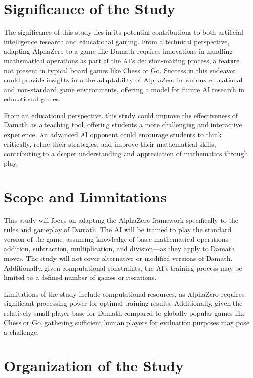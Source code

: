 \section{Significance of the Study}

The significance of this study lies in its potential contributions to both artificial intelligence research and educational gaming. From a technical perspective, adapting AlphaZero to a game like Damath requires innovations in handling mathematical operations as part of the AI’s decision-making process, a feature not present in typical board games like Chess or Go. Success in this endeavor could provide insights into the adaptability of AlphaZero in various educational and non-standard game environments, offering a model for future AI research in educational games.

From an educational perspective, this study could improve the effectiveness of Damath as a teaching tool, offering students a more challenging and interactive experience. An advanced AI opponent could encourage students to think critically, refine their strategies, and improve their mathematical skills, contributing to a deeper understanding and appreciation of mathematics through play.

\section{Scope and Limnitations}

This study will focus on adapting the AlphaZero framework specifically to the rules and gameplay of Damath. The AI will be trained to play the standard version of the game, assuming knowledge of basic mathematical operations—addition, subtraction, multiplication, and division—as they apply to Damath moves. The study will not cover alternative or modified versions of Damath. Additionally, given computational constraints, the AI’s training process may be limited to a defined number of games or iterations.

Limitations of the study include computational resources, as AlphaZero requires significant processing power for optimal training results. Additionally, given the relatively small player base for Damath compared to globally popular games like Chess or Go, gathering sufficient human players for evaluation purposes may pose a challenge.

\section{Organization of the Study}

